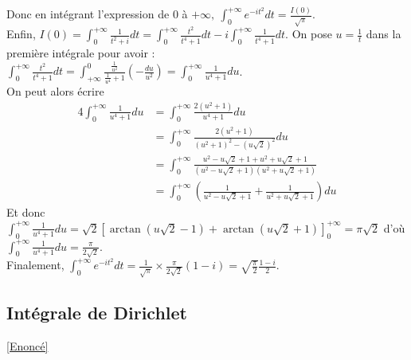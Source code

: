 \documentclass{book}
\begin{document}
\begin{enumerate}
		Donc en intégrant l'expression de $0$ à $+\infty,\ \displaystyle\int_0^{+\infty}e^{-it^2}dt=\frac{I(0)}{\sqrt{\pi}}$.\\
		Enfin, $I(0)=\displaystyle\int_0^{+\infty}\frac{1}{t^2+i}dt=\int_0^{+\infty}\frac{t^2}{t^4+1}dt-i\int_0^{+\infty}\frac{1}{t^4+1}dt$. On pose $u=\displaystyle\frac{1}{t}$ dans la première intégrale pour avoir :\\
		$\displaystyle\int_0^{+\infty}\frac{t^2}{t^4+1}dt=\int_{+\infty}^0\frac{\displaystyle\frac{1}{u^2}}{\displaystyle\frac{1}{u^4}+1}\left(-\frac{du}{u^2}\right)=\int_0^{+\infty}\frac{1}{u^4+1}du$.\\
		On peut alors écrire
		\begin{align*}
			4\displaystyle\int_0^{+\infty}\frac{1}{u^4+1}du&=\int_0^{+\infty}\frac{2(u^2+1)}{u^4+1}du\\
			&=\int_0^{+\infty}\frac{2(u^2+1)}{(u^2+1)^2-(u\sqrt{2})^2}du\\
			&=\int_0^{+\infty}\frac{u^2-u\sqrt{2}+1+u^2+u\sqrt{2}+1}{(u^2-u\sqrt{2}+1)(u^2+u\sqrt{2}+1)}\\
			&=\int_0^{+\infty}\left(\frac{1}{u^2-u\sqrt{2}+1}+\frac{1}{u^2+u\sqrt{2}+1}\right)du
		\end{align*}
		Et donc $\displaystyle\int_0^{+\infty}\frac{1}{u^4+1}du=\sqrt{2}\left[\arctan(u\sqrt{2}-1)+\arctan(u\sqrt{2}+1)\right]_0^{+\infty}=\pi\sqrt{2}$ d'où $\displaystyle\int_0^{+\infty}\frac{1}{u^4+1}du=\frac{\pi}{2\sqrt{2}}$.\\
		Finalement, $\displaystyle\int_0^{+\infty}e^{-it^2}dt=\frac{1}{\sqrt{\pi}}\times\frac{\pi}{2\sqrt{2}}(1-i)=\sqrt{\frac{\pi}{2}}\frac{1-i}{2}$.
	\end{enumerate}
	
	\subsection{Intégrale de Dirichlet}
	\label{Intégrale de Dirichlet corrigé}
	\textcolor{blue}{\hyperref[dirichlet]{[Enoncé]}}\\
\end{document}
